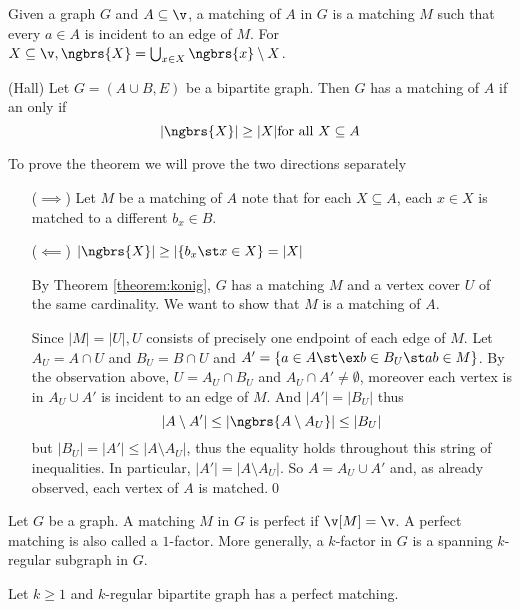 Given a graph $G$ and $A \subseteq \v$, a matching of $A$ in $G$ is a matching $M$ such that every $a \in A$ is incident to an edge of $M$. For $X \subseteq \v, \ngbrs{X} = \bigcup_{x \in X} \ngbrs{x} \setminus X$.
\begin{customtheorem}{(Hall)}
\label{theorem:hall}
    Let $G = (A \cup B, E)$ be a bipartite graph. Then $G$ has a matching of $A$ if an only if
    \begin{equation*}
        |\ngbrs{X}| \geq |X| \text{for all $X \subseteq A$}
    \end{equation*}
\end{customtheorem}
\begin{prf}
    To prove the theorem we will prove the two directions separately
    \begin{itemize}
        \item [($\implies$)] Let $M$ be a matching of $A$ note that for each $X \subseteq A$, each $x \in X$ is matched to a different $b_x \in B$.
        \item [($\impliedby$)] $|\ngbrs{X}| \geq |\{b_x \st x \in X\} = |X|$
        
        By Theorem \ref{theorem:konig}, $G$ has a matching $M$ and a vertex cover $U$ of the same cardinality. We want to show that $M$ is a matching of $A$.

        Since $|M| = |U|, U$ consists of precisely one endpoint of each edge of $M$. Let $A_U = A \cap U$ and $B_U = B \cap U$ and $A' = \{a \in A \st \ex b \in B_U \st ab \in M\}$. By the observation above, $U = A_U \cap B_U$ and $A_U \cap A' \neq \emptyset$, moreover each vertex is in $A_U \cup A'$ is incident to an edge of $M$. And $|A'| = |B_U|$ thus
        \begin{equation*}
            |A \setminus A'| \leq |\ngbrs{A \setminus A_U}| \leq |B_U|
        \end{equation*}
        but $|B_U| = |A'| \leq |A \setminus A_U|$, thus the equality holds throughout this string of inequalities. In particular, $|A'| = |A \setminus A_U|$. So $A = A_U \cup A'$ and, as already observed, each vertex of $A$ is matched.\qed
    \end{itemize}
\end{prf}
Let $G$ be a graph. A matching $M$ in $G$ is perfect if $\v[M] = \v$. A perfect matching is also called a $1$-factor. More generally, a $k$-factor in $G$ is a spanning $k$-regular subgraph in $G$.
\begin{customcorollary}{2.4}
\label{corollary:2.4}
    Let $k \geq 1$ and $k$-regular bipartite graph has a perfect matching.
\end{customcorollary}
